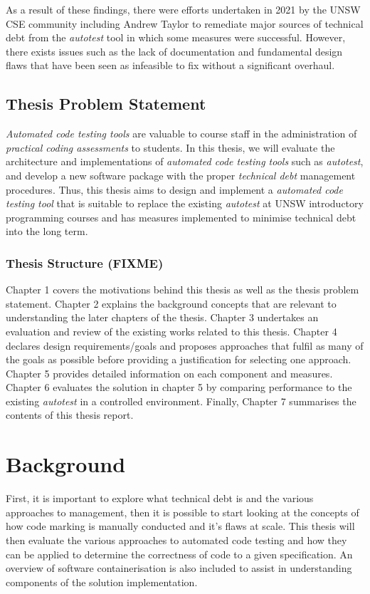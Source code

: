 \documentclass[hidelinks]{report}
\newcommand{\unchapter}[2]{
    \setcounter{chapter}{#1}
    \setcounter{section}{0}
    \chapter*{#2}
    \addcontentsline{toc}{chapter}{#2}
}
\begin{document}
As a result of these findings, there were efforts undertaken in 2021 by the UNSW CSE community including Andrew Taylor to remediate major sources of technical debt from the \textit{autotest} tool in which some measures were successful. However, there exists issues such as the lack of documentation and fundamental design flaws that have been seen as infeasible to fix without a significant overhaul\cite{AutotestIssues}.
\clearpage

\section{Thesis Problem Statement}
\textit{Automated code testing tools} are valuable to course staff in the administration of \textit{practical coding assessments} to students. In this thesis, we will evaluate the architecture and implementations of \textit{automated code testing tools} such as \textit{autotest}, and develop a new software package with the proper \textit{technical debt} management procedures. Thus, this thesis aims to design and implement a \textit{automated code testing tool} that is suitable to replace the existing \textit{autotest} at UNSW introductory programming courses and has measures implemented to minimise technical debt into the long term.

\subsection{Thesis Structure (FIXME)}
Chapter 1 covers the motivations behind this thesis as well as the thesis problem statement.
Chapter 2 explains the background concepts that are relevant to understanding the later chapters of the thesis.
Chapter 3 undertakes an evaluation and review of the existing works related to this thesis.
Chapter 4 declares design requirements/goals and proposes approaches that fulfil as many of the goals as possible before providing a justification for selecting one approach.
Chapter 5 provides detailed information on each component and measures.
Chapter 6 evaluates the solution in chapter 5 by comparing performance to the existing \textit{autotest} in a controlled environment.
Finally, Chapter 7 summarises the contents of this thesis report.

\unchapter{2}{Background}

First, it is important to explore what technical debt is and the various approaches to management, then it is possible to start looking at the concepts of how code marking is manually conducted and it's flaws at scale. This thesis will then evaluate the various approaches to automated code testing and how they can be applied to determine the correctness of code to a given specification. An overview of software containerisation is also included to assist in understanding components of the solution implementation.
\end{document}
